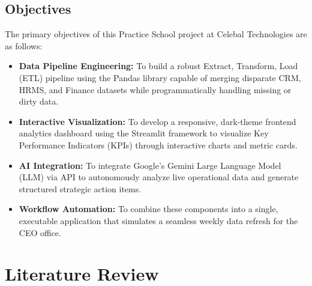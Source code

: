\documentclass{book}
\begin{document}
\section{Objectives}
The primary objectives of this Practice School project at Celebal Technologies are as follows:
\begin{itemize}
    \item \textbf{Data Pipeline Engineering:} To build a robust Extract, Transform, Load (ETL) pipeline using the Pandas library capable of merging disparate CRM, HRMS, and Finance datasets while programmatically handling missing or dirty data.
    \item \textbf{Interactive Visualization:} To develop a responsive, dark-theme frontend analytics dashboard using the Streamlit framework to visualize Key Performance Indicators (KPIs) through interactive charts and metric cards.
    \item \textbf{AI Integration:} To integrate Google's Gemini Large Language Model (LLM) via API to autonomously analyze live operational data and generate structured strategic action items.
    \item \textbf{Workflow Automation:} To combine these components into a single, executable application that simulates a seamless weekly data refresh for the CEO office.
\end{itemize}













\chapter{Literature Review}
\end{document}
